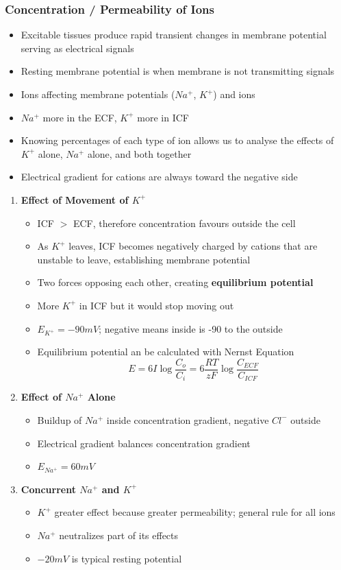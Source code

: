 \documentclass[11pt]{article}
\begin{document}
\subsubsection{Concentration / Permeability of Ions }
\begin{itemize}
\item Excitable tissues produce rapid transient changes in membrane potential serving as electrical signals
\item Resting membrane potential is when membrane is not transmitting signals 
\item Ions affecting membrane potentials ($Na^+$, $K^+$) and ions
\item $Na^+ $ more in the ECF, $K^+$ more in ICF
\item Knowing percentages of each type of ion allows us to analyse the effects of $K^+$ alone, $Na^+$ alone, and both together
\item Electrical gradient for cations are always toward the negative side

\end{itemize}
\begin{enumerate}
\item \textbf{Effect of Movement of $K^+$}
\begin{itemize}
\item ICF $>$ ECF, therefore concentration favours outside the cell
\item As $K^+$ leaves, ICF becomes negatively charged by cations that are unstable to leave, establishing membrane potential
\item Two forces opposing each other, creating \textbf{equilibrium potential}
\item More $K^+$ in ICF but it would stop moving out
\item $E_{K^+} = -90 mV$; negative means inside is -90 to the outside 
\item Equilibrium potential an be calculated with Nernst Equation
$$ E = 6I \log \frac{C_o}{C_i} = 6 \frac{RT}{zF} \log \frac{C_{ECF}}{C_{ICF}}$$
\end{itemize}
\item \textbf{Effect of $Na^+$ Alone}
\begin{itemize}
\item Buildup of $Na^+$ inside concentration gradient, negative $Cl^-$ outside
\item Electrical gradient balances concentration gradient 
\item $E_{Na^+} = 60 mV $
\end{itemize}
\item \textbf{Concurrent $Na^+$ and $K^+$}
\begin{itemize}
\item $K^+$ greater effect because greater permeability; general rule for all ions
\item $Na^+$ neutralizes part of its effects
\item $-20 mV$ is typical resting potential 
\end{itemize}
\end{enumerate}
\end{document}
